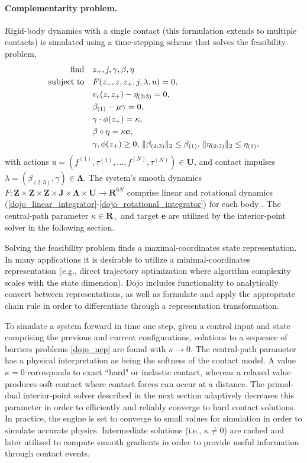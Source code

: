 \paragraph{Complementarity problem.}
Rigid-body dynamics with a single contact (this formulation extends to multiple contacts) is simulated using a time-stepping scheme that solves the feasibility problem,
\begin{align}
	\label{dojo_ncp}
	{\mbox{find}} \quad & z_{+}, j, \gamma, \beta, \eta\\
	\mbox{subject to} \quad & F(z_{-}, z, z_{+}, j, \lambda, u) = 0, \notag \\
	& v_c(z, z_{+}) - \eta_{(2:3)} = 0, \notag \\
	& \beta_{(1)} - \mu \gamma = 0, \notag\\
	& \gamma \cdot \phi(z_{+}) = \kappa, \notag \\
	& \beta \circ \eta = \kappa \mathbf{e}, \notag \\
	& \gamma, \phi(z_{+}) \geq 0, \, \|\beta_{(2:3)}\|_2 \leq \beta_{(1)}, \, \|\eta_{(2:3)}\|_2 \leq \eta_{(1)}, \notag
\end{align}
with actions $u = (f^{(1)}, \tau^{(1)}, \dots, f^{(N)}, \tau^{(N)}) \in \mathbf{U}$, and contact impulses $\lambda = (\beta_{(2:3)}, \gamma) \in \mathbf{\Lambda}$. The system's smooth dynamics $F : \mathbf{Z} \times \mathbf{Z} \times \mathbf{Z} \times \mathbf{J} \times \mathbf{\Lambda} \times \mathbf{U} \rightarrow \mathbf{R}^{6N}$ comprise linear and rotational dynamics (\ref{dojo_linear_integrator}-\ref{dojo_rotational_integrator}) for each body \cite{brudigam2020linear}. The central-path parameter $\kappa \in \mathbf{R}_{+}$ and target $\mathbf{e}$ \cite{vandenberghe2010cvxopt} are utilized by the interior-point solver in the following section. 

Solving the feasibility problem finds a maximal-coordinates state representation. In many applications it is desirable to utilize a minimal-coordinates representation (e.g., direct trajectory optimization where algorithm complexity scales with the state dimension). Dojo includes functionality to analytically convert between representations, as well as formulate and apply the appropriate chain rule in order to differentiate through a representation transformation.

To simulate a system forward in time one step, given a control input and state comprising the previous and current configurations, solutions to a sequence of barriers problems \eqref{dojo_ncp} are found with $\kappa \rightarrow 0$. The central-path parameter has a physical interpretation as being the softness of the contact model. A value $\kappa = 0$ corresponds to exact ``hard" or inelastic contact, whereas a relaxed value produces soft contact where contact forces can occur at a distance. The primal-dual interior-point solver described in the next section adaptively decreases this parameter in order to efficiently and reliably converge to hard contact solutions. In practice, the engine is set to converge to small values for simulation in order to simulate accurate physics. Intermediate solutions (i.e., $\kappa \neq 0$) are cached and later utilized to compute smooth gradients in order to provide useful information through contact events.

